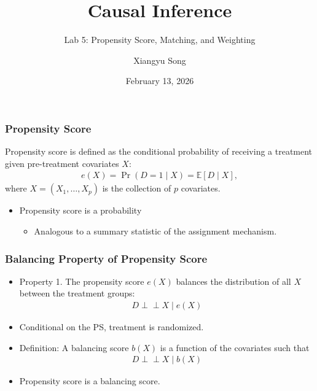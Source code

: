 \documentclass[10pt, handout]{beamer}
\title[Causal Lab]{Causal Inference}
\subtitle[]{Lab 5: Propensity Score, Matching, and Weighting}
\author[Song]{Xiangyu Song}
\institute{Washington University in St. Louis}
\date{February 13, 2026}
\newcommand{\ind}{\perp\!\!\!\!\perp}
\begin{document}
\maketitle
    

    \begin{frame}
      \frametitle{Propensity Score}

      \begin{definition}
       Propensity score is defined as the conditional probability of receiving a treatment given pre-treatment covariates $X$:
        \begin{align*}
          e(X) = \Pr \left( D = 1 \mid X \right) = \mathbb{E} \left[ D \mid X \right],
        \end{align*}
        where $X = (X_1, \ldots, X_p)$ is the collection of $p$ covariates.
      \end{definition}      
      
      \begin{itemize}
        \item Propensity score is a probability
        \begin{itemize}
          \item Analogous to a summary statistic of the assignment mechanism.
        \end{itemize}
      \end{itemize}
    \end{frame}
    
    \begin{frame}
      \frametitle{Balancing Property of Propensity Score}
      \begin{itemize}
        \item Property 1. The propensity score $e(X)$ balances the distribution of all $X$ between the treatment groups:
        \begin{align*}
          D \ind X \mid e(X)
        \end{align*}
        \item Conditional on the PS, treatment is randomized.
        \item Definition: A balancing score $b(X)$ is a function of the covariates such that
        \begin{align*}
          D \ind X \mid b(X)
        \end{align*}
        \item Propensity score is a balancing score.
      \end{itemize}
    \end{frame}
\end{document}
